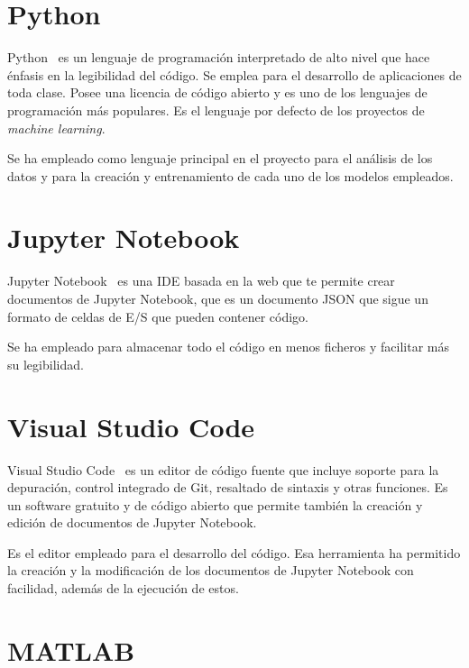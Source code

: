 
\section{Python}

Python~\cite{python} es un lenguaje de programación interpretado de alto nivel que hace énfasis en la legibilidad del código. Se emplea para el desarrollo de aplicaciones de toda clase. Posee una licencia de código abierto y es uno de los lenguajes de programación más populares. Es el lenguaje por defecto de los proyectos de \textit{machine learning}.

\par

Se ha empleado como lenguaje principal en el proyecto para el análisis de los datos y para la creación y entrenamiento de cada uno de los modelos empleados.

\section{Jupyter Notebook}

Jupyter Notebook~\cite{jupyter} es una IDE basada en la web que te permite crear documentos de Jupyter Notebook, que es un documento JSON que sigue un formato de celdas de E/S que pueden contener código.

\par

Se ha empleado para almacenar todo el código en menos ficheros y facilitar más su legibilidad.

\section{Visual Studio Code}

Visual Studio Code~\cite{vscode} es un editor de código fuente que incluye soporte para la depuración, control integrado de Git, resaltado de sintaxis y otras funciones. Es un software gratuito y de código abierto que permite también la creación y edición de documentos de Jupyter Notebook.

\par

Es el editor empleado para el desarrollo del código. Esa herramienta ha permitido la creación y la modificación de los documentos de Jupyter Notebook con facilidad, además de la ejecución de estos.

\section{MATLAB}

